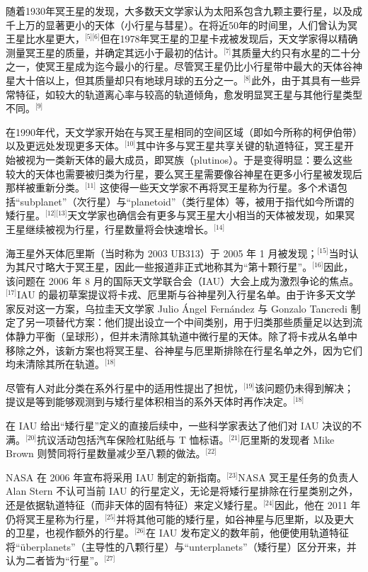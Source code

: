随着1930年冥王星的发现，大多数天文学家认为太阳系包含九颗主要行星，以及成千上万的显著更小的天体（小行星与彗星）。在将近50年的时间里，人们曾认为冥王星比水星更大，\(^\text{[5][6]}\)但在1978年冥王星的卫星卡戎被发现后，天文学家得以精确测量冥王星的质量，并确定其远小于最初的估计。\(^\text{[7]}\)其质量大约只有水星的二十分之一，使冥王星成为迄今最小的行星。尽管冥王星仍比小行星带中最大的天体谷神星大十倍以上，但其质量却只有地球月球的五分之一。\(^\text{[8]}\)此外，由于其具有一些异常特征，如较大的轨道离心率与较高的轨道倾角，愈发明显冥王星与其他行星类型不同。\(^\text{[9]}\)

在1990年代，天文学家开始在与冥王星相同的空间区域（即如今所称的柯伊伯带）以及更远处发现更多天体。\(^\text{[10]}\)其中许多与冥王星共享关键的轨道特征，冥王星开始被视为一类新天体的最大成员，即冥族（plutinos）。于是变得明显：要么这些较大的天体也需要被归类为行星，要么冥王星需要像谷神星在更多小行星被发现后那样被重新分类。\(^\text{[11]}\) 这使得一些天文学家不再将冥王星称为行星。多个术语包括“subplanet”（次行星）与“planetoid”（类行星体）等，被用于指代如今所谓的矮行星。\(^\text{[12][13]}\)天文学家也确信会有更多与冥王星大小相当的天体被发现，如果冥王星继续被视为行星，行星数量将会快速增长。\(^\text{[14]}\)

海王星外天体厄里斯（当时称为 2003 UB313）于 2005 年 1 月被发现；\(^\text{[15]}\)当时认为其尺寸略大于冥王星，因此一些报道非正式地称其为“第十颗行星”。\(^\text{[16]}\)因此，该问题在 2006 年 8 月的国际天文学联合会（IAU）大会上成为激烈争论的焦点。\(^\text{[17]}\)IAU 的最初草案提议将卡戎、厄里斯与谷神星列入行星名单。由于许多天文学家反对这一方案，乌拉圭天文学家 Julio Ángel Fernández 与 Gonzalo Tancredi 制定了另一项替代方案：他们提出设立一个中间类别，用于归类那些质量足以达到流体静力平衡（呈球形），但并未清除其轨道中微行星的天体。除了将卡戎从名单中移除之外，该新方案也将冥王星、谷神星与厄里斯排除在行星名单之外，因为它们均未清除其所在轨道。\(^\text{[18]}\)

尽管有人对此分类在系外行星中的适用性提出了担忧，\(^\text{[19]}\)该问题仍未得到解决；提议是等到能够观测到与矮行星体积相当的系外天体时再作决定。\(^\text{[18]}\)

在 IAU 给出“矮行星”定义的直接后续中，一些科学家表达了他们对 IAU 决议的不满。\(^\text{[20]}\)抗议活动包括汽车保险杠贴纸与 T 恤标语。\(^\text{[21]}\)厄里斯的发现者 Mike Brown 则赞同将行星数量减少至八颗的做法。\(^\text{[22]}\)

NASA 在 2006 年宣布将采用 IAU 制定的新指南。\(^\text{[23]}\)NASA 冥王星任务的负责人 Alan Stern 不认可当前 IAU 的行星定义，无论是将矮行星排除在行星类别之外，还是依据轨道特征（而非天体的固有特征）来定义矮行星。\(^\text{[24]}\)因此，他在 2011 年仍将冥王星称为行星，\(^\text{[25]}\)并将其他可能的矮行星，如谷神星与厄里斯，以及更大的卫星，也视作额外的行星。\(^\text{[26]}\)在 IAU 发布定义的数年前，他便使用轨道特征将“überplanets”（主导性的八颗行星）与“unterplanets”（矮行星）区分开来，并认为二者皆为“行星”。\(^\text{[27]}\)
